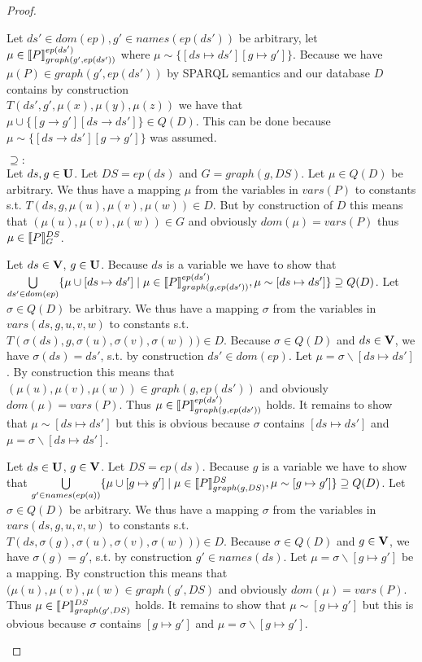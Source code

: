 \begin{proof}
\begin{enumerate}
			Let $ds'\in dom(ep), g' \in names(ep(ds'))$ be arbitrary, let $\mu \in \llbracket P
			\rrbracket^{ep(ds')}_{graph(g',ep(ds'))}$ where $\mu \sim \{[ds\mapsto ds'][g \mapsto
			g'] \}$.
			Because we have $\mu(P) \in graph(g',ep(ds'))$ by SPARQL semantics and our database
			$D$ contains by construction\\ $T(ds',g',\mu(x),\mu(y),\mu(z))$ we have that
			$\mu \cup \{[g \rightarrow g'][ds \rightarrow ds'] \}\in Q(D)$. 
			This can be done because $\mu 
			\sim \{[ds \rightarrow ds'][g \rightarrow g']\}$ was assumed. 

			\bigskip\noindent$\supseteq:$\\
			Let $ds,g \in \mathbf{U}$. Let $DS = ep(ds)$ and $G = graph(g,DS)$.
			Let $\mu \in Q(D)$ be arbitrary.
			We thus have a mapping $\mu$ from the variables in $vars(P)$ to constants s.t.
			$T(ds,g,\mu(u),\mu(v),\mu(w)) \in D$. 
			But by construction of $D$ this means that
			$(\mu(u),\mu(v),\mu(w)) \in G$ 
			and obviously $dom(\mu) = vars(P)$ thus $\mu \in \llbracket P
			\rrbracket^{DS}_{G}$. 

			\bigskip\noindent
			Let $ds \in \mathbf{V}$, $g \in \mathbf{U}$.
			Because $ds$ is a variable we have to show that 
			$\bigcup\limits_{ds' \in dom(ep)} \{ \mu \cup [ds \mapsto ds'] \mid \mu \in \llbracket P
			\rrbracket^{ep(ds')}_{graph(g,ep(ds'))},\mu \sim [ds \mapsto ds']\} \supseteq Q(D)$.
			Let $\sigma \in Q(D)$ be arbitrary.
			We thus have a mapping $\sigma$ from the 
			variables in $vars(ds,g,u,v,w)$ to constants s.t.\\
			$T(\sigma(ds),g,\sigma(u),\sigma(v),\sigma(w)))
			\in D$. Because $\sigma \in Q(D)$ and $ds \in \mathbf{V}$, we have
			$\sigma(ds) = ds'$, s.t. by construction $ds' \in dom(ep)$. 
			Let $\mu = \sigma\backslash[ds\mapsto ds']$. 
			By construction this means that
			$(\mu(u),\mu(v),\mu(w)) \in graph(g,ep(ds'))$ and obviously
			$dom(\mu) = vars(P)$. Thus $\mu \in \llbracket
			P\rrbracket^{ep(ds')}_{graph(g,ep(ds'))}$ holds. 
			It remains to show that
			$\mu \sim [ds \mapsto ds']$
			but this is obvious because $\sigma$ contains $[ds \mapsto ds']$ and $\mu = \sigma
			\backslash [ds \mapsto ds']$. 

			\bigskip\noindent
			Let $ds \in \mathbf{U}$, $g \in \mathbf{V}$. Let $DS = ep(ds)$.
			Because $g$ is a variable we have to show that 
			$\bigcup\limits_{g' \in names(ep(a))} \{ \mu \cup [g \mapsto g'] \mid \mu \in \llbracket P
			\rrbracket^{DS}_{graph(g,DS)},\mu \sim [g \mapsto g']\} \supseteq Q(D)$.
			Let $\sigma \in Q(D)$ be arbitrary.
			We thus have a mapping $\sigma$ from the variables in
			$vars(ds,g,u,v,w)$ to constants s.t.\\
			$T(ds,\sigma(g),\sigma(u),\sigma(v),\sigma(w))) \in D$.
			Because $\sigma \in Q(D)$ and $g \in \mathbf{V}$, we have
			$\sigma(g) = g'$, s.t. by construction $g' \in names(ds)$. Let $\mu =
			\sigma\backslash[g\mapsto g']$ be a mapping. By construction 
			this means that	$(\mu(u),\mu(v),\mu(w) \in graph(g',DS)$ 
			and obviously $dom(\mu) = vars(P)$. Thus $\mu \in \llbracket P
			\rrbracket^{DS}_{graph(g',DS)}$ holds. It remains to show that $\mu \sim [g \mapsto g']$
			but this is obvious because $\sigma$ contains $[g \mapsto g']$ and $\mu = \sigma
			\backslash [g \mapsto g']$.


\end{enumerate}
\end{proof}
